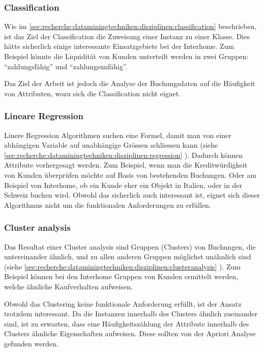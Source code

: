 \subsubsection{Classification}
\label{sec:konzept:disziplinauswahl:classification}
Wie im \cref{sec:recherche:dataminingtechniken:disziplinen:classification}  beschrieben, ist das Ziel der Classification die Zuweisung einer Instanz zu einer Klasse. Dies hätte sicherlich einige interessante Einsatzgebiete bei der Interhome. Zum Beispiel könnte die Liquidität von Kunden unterteilt werden in zwei Gruppen: "`zahlungsfähig"' und "`zahlungsunfähig"'.

Das Ziel der Arbeit ist jedoch die Analyse der Buchungsdaten auf die Häufigkeit von Attributen, wozu sich die Classification nicht eignet.

\subsubsection{Lineare Regression}
\label{sec:konzept:disziplinauswahl:regression}
Linere Regression Algorithmen suchen eine Formel, damit man von einer abhängigen Variable auf unabhängige Grössen schliessen kann (siehe \cref{sec:recherche:dataminingtechniken:disziplinen:regression} ). Dadurch können Attribute vorhergesagt werden. Zum Beispiel, wenn man die Kreditwürdigkeit von Kunden überprüfen möchte auf Basis von bestehenden Buchungen. Oder am Beispiel von Interhome, ob ein Kunde eher ein Objekt in Italien, oder in der Schweiz buchen wird. Obwohl das sicherlich auch interessant ist, eignet sich dieser Algorithmus nicht um die funktionalen Anforderungen zu erfüllen.

\subsubsection{Cluster analysis}
\label{sec:konzept:disziplinauswahl:clusteranalysis}
Das Resultat einer Cluster analysis sind Gruppen (Clusters) von Buchungen, die untereinander ähnlich, und zu allen anderen Gruppen möglichst unähnlich sind (siehe \cref{sec:recherche:dataminingtechniken:disziplinen:clusteranalysis} ). Zum Beispiel können bei den Interhome Gruppen von Kunden ermittelt werden, welche ähnliche Kaufverhalten aufweisen. 

Obwohl das Clustering keine funktionale Anforderung erfüllt, ist der Ansatz trotzdem interessant. Da die Instanzen innerhalb des Clusters ähnlich zueinander sind, ist zu erwarten, dass eine Häufigkeitszählung der Attribute innerhalb des Clusters ähnliche Eigenschaften aufweisen. Diese sollten von der Apriori Analyse gefunden werden. 


